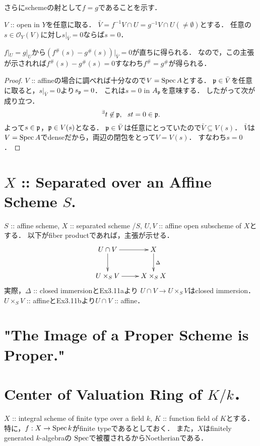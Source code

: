 \documentclass[a4paper]{jsarticle}
\newcommand{\shO}{\mathcal{O}}
\begin{document}
    さらにschemeの射として$f=g$であることを示す．
    \begin{Claim}
        $V$ :: open in $Y$を任意に取る．
        $\bar{V}=f^{-1}V \cap U=g^{-1}V \cap U(\neq \emptyset)$とする．
        任意の$s \in \shO_Y(V)$に対し$s|_{\bar{V}}=0$ならば$s=0$．
    \end{Claim}
    $f|_U=g|_U$から$(f^{\#}(s)-g^{\#}(s))|_{\bar{V}}=0$が直ちに得られる．
    なので，この主張が示されれば$f^{\#}(s)-g^{\#}(s)=0$すなわち$f^{\#}=g^{\#}$が得られる．
    \begin{proof}
        $V$ :: affineの場合に調べれば十分なので$V=\operatorname{Spec} A$とする．
        $\mathfrak{p} \in \bar{V}$を任意に取ると，$s|_{\bar{V}}=0$より$s_{\mathfrak{p}}=0$．
        これは$s=0$ in $A_{\mathfrak{p}}$を意味する．
        したがって次が成り立つ．
        \[ {}^{\exists} t \not \in \mathfrak{p},~~ st=0 \in \mathfrak{p}. \]
        よって$s \in \mathfrak{p}$，$\mathfrak{p} \in V(s)$となる．
        $\mathfrak{p} \in \bar{V}$は任意にとっていたので$\bar{V} \subseteq V(s)$．
        $\bar{V}$は$V=\operatorname{Spec} A$でdenseだから，両辺の閉包をとって$V=V(s)$．
        すなわち$s=0$．
    \end{proof}

\section{$X$ :: Separated over an Affine Scheme $S$.} %
    $S$ :: affine scheme, $X$ :: separated scheme /$S$,
    $U, V$ :: affine open subscheme of $X$とする．
    以下がfiber productであれば，主張が示せる．
    \[
    \xymatrix
    {
        U \cap V \ar[d]\ar[r]& X \ar[d]^-{\Delta} \\
    U \times_S V \ar[r]& X \times_S X
    }
    \]
    実際，$\Delta$ :: closed immersionとEx3.11aより
    $U \cap V \to U \times_S V$はclosed immersion．
    $U \times_S V$ :: affineとEx3.11bより$U \cap V$ :: affine．

\section{"The Image of a Proper Scheme is Proper."} %

\section{Center of Valuation Ring of $K/k$．} %
    $X$ :: integral scheme of finite type over a field $k$,
    $K$ :: function field of $K$とする．
    特に，$f: X \to \operatorname{Spec} k$がfinite typeであるとしておく．
    また，$X$はfinitely generated $k$-algebraの
    $\operatorname{Spec}$で被覆されるからNoetherianである．
\end{document}
